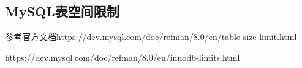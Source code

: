 \documentclass[../../../interview-questions.tex]{subfiles}
\begin{document}
\subsection{MySQL表空间限制}

参考官方文档https://dev.mysql.com/doc/refman/8.0/en/table-size-limit.html

https://dev.mysql.com/doc/refman/8.0/en/innodb-limits.html
\end{document}
